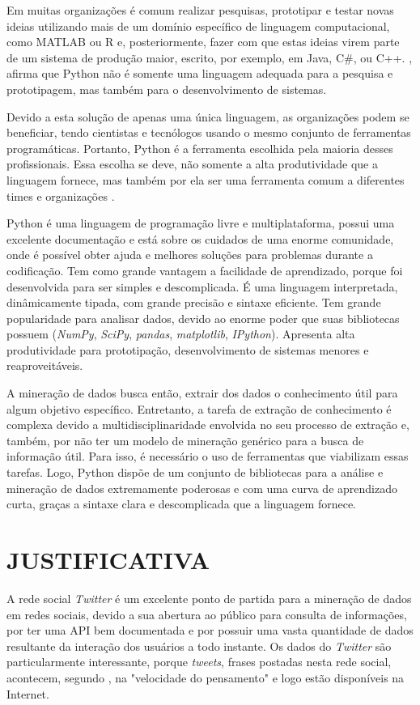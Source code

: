 Em muitas organizações é comum realizar pesquisas, prototipar e testar novas ideias utilizando mais de um domínio específico de linguagem computacional, como MATLAB ou R e, posteriormente, fazer com que estas ideias virem parte de um sistema de produção maior, escrito, por exemplo, em Java, C\#, ou C++. , afirma que Python não é somente uma linguagem adequada para a pesquisa e prototipagem, mas também para o desenvolvimento de sistemas.

Devido a esta solução de apenas uma única linguagem, as organizações podem se beneficiar, tendo cientistas e tecnólogos usando o mesmo conjunto de ferramentas programáticas. Portanto, Python é a ferramenta escolhida pela maioria desses profissionais. Essa escolha se deve, não somente a alta produtividade que a linguagem fornece, mas também por ela ser uma ferramenta comum a diferentes times e organizações \cite{kaldero}. 

Python é uma linguagem de programação livre e multiplataforma, possui uma excelente documentação e está sobre os cuidados de uma enorme comunidade, onde é possível obter ajuda e melhores soluções para problemas durante a codificação. Tem como grande vantagem a facilidade de aprendizado, porque foi desenvolvida para ser simples e descomplicada. É uma linguagem interpretada, dinâmicamente tipada, com grande precisão e sintaxe eficiente. Tem grande popularidade para analisar dados, devido ao enorme poder que suas bibliotecas possuem (\textit{NumPy}, \textit{SciPy}, \textit{pandas}, \textit{matplotlib}, \textit{IPython}). Apresenta alta produtividade para prototipação, desenvolvimento de sistemas menores e reaproveitáveis.

A mineração de dados busca então, extrair dos dados o conhecimento útil para algum objetivo específico. Entretanto, a tarefa de extração de conhecimento é complexa devido a multidisciplinaridade envolvida no seu processo de extração e, também, por não ter um modelo de mineração genérico para a busca de informação útil. Para isso, é necessário o uso de ferramentas que viabilizam essas tarefas. Logo, Python dispõe de um conjunto de bibliotecas para a análise e mineração de dados extremamente poderosas e com uma curva de aprendizado curta, graças a sintaxe clara e descomplicada que a linguagem fornece.


\section{JUSTIFICATIVA}\label{sec:justificativa}
A rede social \textit{Twitter} é um excelente ponto de partida para a mineração de dados em redes sociais, devido a sua abertura ao público para consulta de informações, por ter uma API bem documentada e por possuir uma vasta quantidade de dados resultante da interação dos usuários a todo instante. Os dados do \textit{Twitter} são particularmente interessante, porque \textit{tweets}, frases postadas nesta rede social, acontecem, segundo , na "velocidade do pensamento" \space e logo estão disponíveis na Internet.


